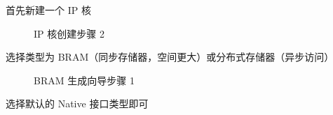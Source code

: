\documentclass[hyperref,UTF8,12pt,a4paper]{ctexart}
\begin{document}
首先新建一个 IP 核

\begin{figure}[H]
\centering
{}
\caption{IP 核创建步骤 2}
\end{figure}

选择类型为 BRAM（同步存储器，空间更大）或分布式存储器（异步访问）

\begin{figure}[H]
\centering
{}
\caption{BRAM 生成向导步骤 1}
\end{figure}

选择默认的 Native 接口类型即可
\end{document}
